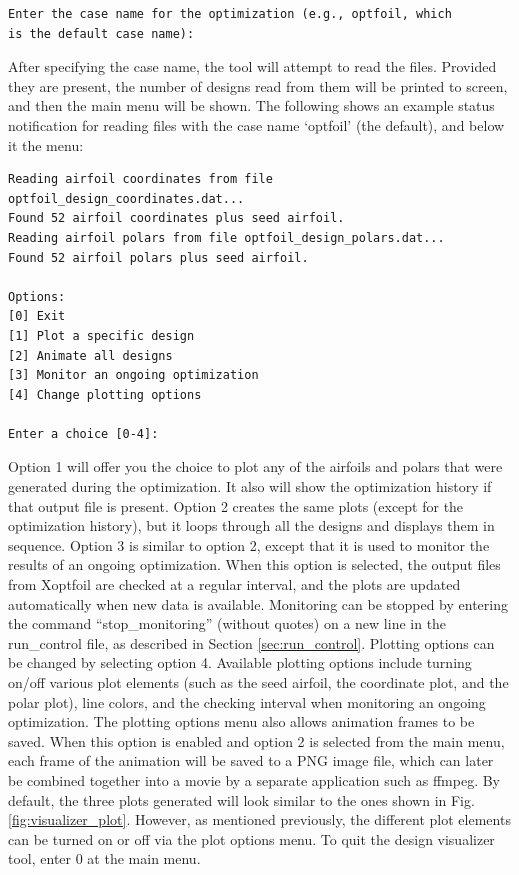 \documentclass[11pt]{article}
\begin{document}
\begin{verbatim}
Enter the case name for the optimization (e.g., optfoil, which 
is the default case name): 
\end{verbatim}

After specifying the case name, the tool will attempt to read the files.  Provided they
are present, the number of designs read from them will be printed to screen, and then the
main menu will be shown.  The following shows an example status notification for reading
files with the case name `optfoil' (the default), and below it the menu:

\begin{verbatim}
Reading airfoil coordinates from file optfoil_design_coordinates.dat...
Found 52 airfoil coordinates plus seed airfoil.
Reading airfoil polars from file optfoil_design_polars.dat...
Found 52 airfoil polars plus seed airfoil.

Options:
[0] Exit
[1] Plot a specific design
[2] Animate all designs 
[3] Monitor an ongoing optimization
[4] Change plotting options

Enter a choice [0-4]: 
\end{verbatim}

Option 1 will offer you the choice to plot any of the airfoils and polars that were
generated during the optimization. It also will show the optimization history if that
output file is present. Option 2 creates the same plots (except for the optimization 
history), but it loops through all the designs and displays them in sequence. Option 3 is
similar to option 2, except that it is used to monitor the results of an ongoing
optimization. When this option is selected, the output files from Xoptfoil are checked at
a regular interval, and the plots are updated automatically when new data is available. 
Monitoring can be stopped by entering the command ``stop\_monitoring'' (without quotes) on
a new line in the run\_control file, as described in Section \ref{sec:run_control}.
Plotting options can be 
changed by selecting option 4.  Available plotting options include turning on/off various
plot elements (such as the seed airfoil, the coordinate  plot, and the polar plot), line 
colors, and the checking interval when monitoring an ongoing optimization.  The plotting 
options menu also allows animation frames to be saved. When this option is enabled and 
option 2 is selected from the main menu, each frame of the animation will be saved to a
PNG image file, which can later be combined together into a movie by a separate
application such as ffmpeg.  By default, the three plots generated  will look similar to 
the ones shown in Fig. \ref{fig:visualizer_plot}.  However, as mentioned
previously, the different plot elements can be turned on or off via the plot options menu.
To quit the design visualizer tool, enter 0 at the main menu.
\end{document}
